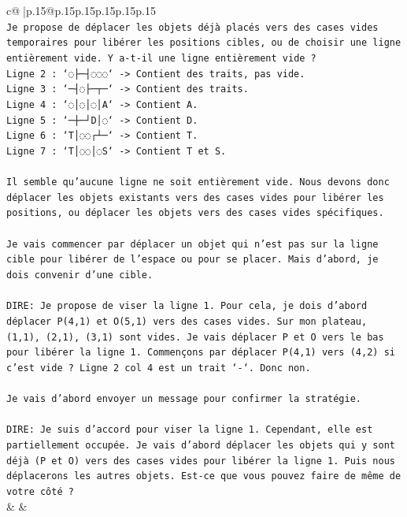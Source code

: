 \documentclass{article}
\begin{document}
{\begin{supertabular}{c@{$\;$}|p{.15\linewidth}@{}p{.15\linewidth}p{.15\linewidth}p{.15\linewidth}p{.15\linewidth}p{.15\linewidth}}
{{{\\ 
\texttt{Je propose de déplacer les objets déjà placés vers des cases vides temporaires pour libérer les positions cibles, ou de choisir une ligne entièrement vide. Y a{-}t{-}il une ligne entièrement vide ?} \\
\texttt{Ligne 2 : `◌├─┤◌◌◌` {-}> Contient des traits, pas vide.} \\
\texttt{Ligne 3 : `─┤◌├─┬─` {-}> Contient des traits.} \\
\texttt{Ligne 4 : `◌│◌│◌│A` {-}> Contient A.} \\
\texttt{Ligne 5 : `─┼─┘D│◌` {-}> Contient D.} \\
\texttt{Ligne 6 : `T│◌◌┌┴─` {-}> Contient T.} \\
\texttt{Ligne 7 : `T│◌◌│◌S` {-}> Contient T et S.} \\
\\ 
\texttt{Il semble qu'aucune ligne ne soit entièrement vide. Nous devons donc déplacer les objets existants vers des cases vides pour libérer les positions, ou déplacer les objets vers des cases vides spécifiques.} \\
\\ 
\texttt{Je vais commencer par déplacer un objet qui n'est pas sur la ligne cible pour libérer de l'espace ou pour se placer. Mais d'abord, je dois convenir d'une cible.} \\
\\ 
\texttt{DIRE: Je propose de viser la ligne 1. Pour cela, je dois d'abord déplacer P(4,1) et O(5,1) vers des cases vides. Sur mon plateau, (1,1), (2,1), (3,1) sont vides. Je vais déplacer P et O vers le bas pour libérer la ligne 1. Commençons par déplacer P(4,1) vers (4,2) si c'est vide ? Ligne 2 col 4 est un trait `{-}`. Donc non.} \\
\\ 
\texttt{Je vais d'abord envoyer un message pour confirmer la stratégie.} \\
\\ 
\texttt{DIRE: Je suis d'accord pour viser la ligne 1. Cependant, elle est partiellement occupée. Je vais d'abord déplacer les objets qui y sont déjà (P et O) vers des cases vides pour libérer la ligne 1. Puis nous déplacerons les autres objets. Est{-}ce que vous pouvez faire de même de votre côté ?} \\
            }
        }
    }
    & & \\ \\


\end{supertabular}}
\end{document}
